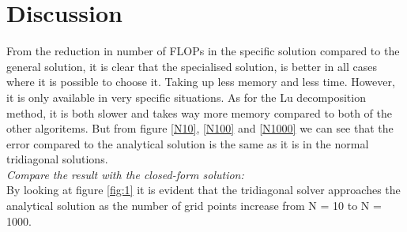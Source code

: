 \documentclass[%
reprint,
amsmath,amssymb,
aps,
]{revtex4-1}
\begin{document}
\section*{Discussion} 
From the reduction in number of FLOPs in the specific solution compared to the general solution, it is clear that the specialised solution, is better in all cases where it is possible to choose it. Taking up less memory and less time. However, it is only available in very specific situations. As for the Lu decomposition method, it is both slower and takes way more memory compared to both of the other algoritems. But from figure \ref{N10}, \ref{N100} and \ref{N1000} we can see that the error compared to the analytical solution is the same as it is in the normal tridiagonal solutions. \\
\textit{Compare the result with the closed-form solution:}\\
By looking at figure \ref{fig:1} it is evident that the tridiagonal solver approaches the analytical solution as the number of grid points increase from N = 10 to N = 1000.
\end{document}
